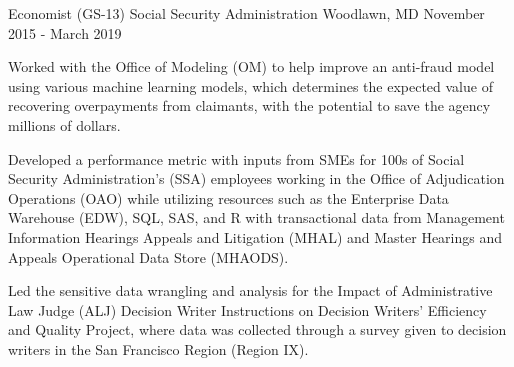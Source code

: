 \begin{cventries}

\cventry
{Economist (GS-13)} %
{Social Security Administration} %
{Woodlawn, MD} %
{November 2015 - March 2019} %
{ %
\begin{cvitems}
\item {Worked with the Office of Modeling (OM) to help improve an anti-fraud model using various machine learning models, which determines the expected value of recovering overpayments from claimants, with the potential to save the agency millions of dollars.}
\item {Developed a performance metric with inputs from SMEs for 100s of Social Security Administration's (SSA) employees working in the Office of Adjudication Operations (OAO) while utilizing resources such as the Enterprise Data Warehouse (EDW), SQL, SAS, and R with transactional data from Management Information Hearings Appeals and Litigation (MHAL) and Master Hearings and Appeals Operational Data Store (MHAODS).}
\item {Led the sensitive data wrangling and analysis for the Impact of Administrative Law Judge (ALJ) Decision Writer Instructions on Decision Writers' Efficiency and Quality Project, where data was collected through a survey given to decision writers in the San Francisco Region (Region IX).}
\end{cvitems} 
}



\end{cventries}
